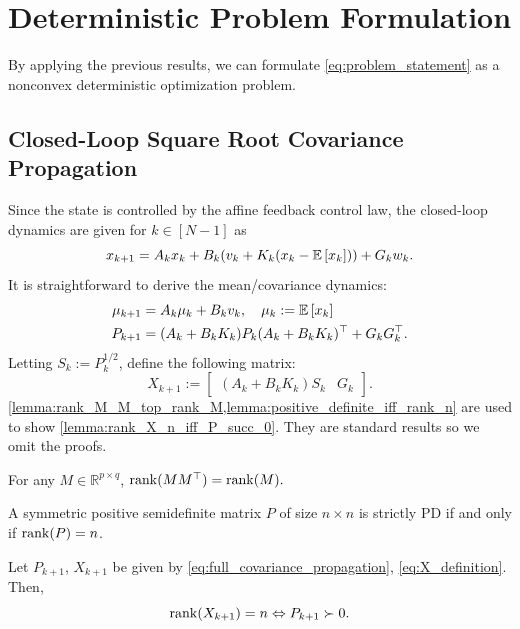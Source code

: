 
\section{Deterministic Problem Formulation}
By applying the previous results, we can formulate \cref{eq:problem_statement} as a nonconvex deterministic optimization problem.
\subsection{Closed-Loop Square Root Covariance Propagation}
Since the state is controlled by the affine feedback control law, the closed-loop dynamics are given for $k \in [N{-}1]$ as
\begin{equation}
	x_{k+1} = A_k x_k + B_k (v_k + K_k (x_k - \mathbb{E}\left[x_k\right])) + G_k w_k.
\end{equation}
It is straightforward to derive the mean/covariance dynamics:
\begin{align} \label{eq:mean_dynamics}
	\mu_{k+1} &= A_k \mu_k + B_k v_k , \quad \mu_k := \mathbb{E}\left[x_k\right]\\
\label{eq:full_covariance_propagation}
	P_{k+1}& = (A_k + B_k K_k) P_k (A_k + B_k K_k)^\top + G_k G_k^\top.
\end{align}
Letting $S_k := P_k^{1/2}$, define the following matrix:
\begin{equation} \label{eq:X_definition}
	X_{k+1} := \begin{bmatrix} (A_k + B_k K_k) S_k & G_k \end{bmatrix}.
\end{equation}
\cref{lemma:rank_M_M_top_rank_M,lemma:positive_definite_iff_rank_n} are used to show \cref{lemma:rank_X_n_iff_P_succ_0}. They are standard results so we omit the  proofs.
\begin{lemma} \label{lemma:rank_M_M_top_rank_M}
	For any $M \in \mathbb{R}^{p \times q}$, $\rank(M M^\top) = \rank(M).$
\end{lemma}
\begin{lemma} \label{lemma:positive_definite_iff_rank_n}
	A symmetric positive semidefinite matrix $P$ of size $n \times n$ is strictly PD if and only if $\rank(P) = n$.
\end{lemma}
\begin{lemma} \label{lemma:rank_X_n_iff_P_succ_0}
	Let $P_{k+1}$, $X_{k+1}$ be given by \cref{eq:full_covariance_propagation}, \cref{eq:X_definition}. Then,
	\begin{equation}
		\rank(X_{k+1}) = n \Leftrightarrow P_{k+1} \succ 0.
	\end{equation}
\end{lemma}
